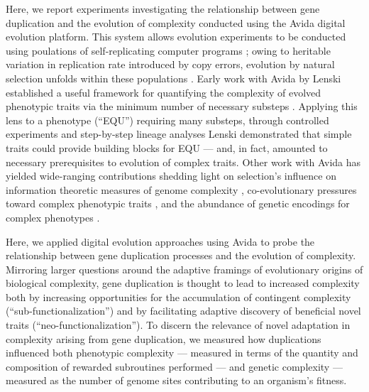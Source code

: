 Here, we report experiments investigating the relationship between gene duplication and the evolution of complexity conducted using the Avida digital evolution platform.
This system allows evolution experiments to be conducted using poulations of self-replicating computer programs \citep{Ofria:2009avida};
owing to heritable variation in replication rate introduced by copy errors, evolution by natural selection unfolds within these populations \citep{pennock2007models}.
Early work with Avida by Lenski established a useful framework for quantifying the complexity of evolved phenotypic traits via the minimum number of necessary substeps  \citet{lenski2003evolutionary}.
Applying this lens to a phenotype  (``EQU'') requiring many substeps, through controlled experiments and step-by-step lineage analyses Lenski demonstrated that simple traits could provide building blocks for EQU --- and, in fact, amounted to necessary prerequisites to evolution of complex traits.
Other work with Avida has yielded wide-ranging contributions shedding light on selection's influence on information theoretic measures of genome complexity \citep{Adami2000Evolution}, co-evolutionary pressures toward complex phenotypic traits \citep{Zaman2014Coevolution}, and the abundance of genetic encodings for complex phenotypes \citep{Fortuna2017GenotypePhenotype}.

Here, we applied digital evolution approaches using Avida to probe the relationship between gene duplication processes and the evolution of complexity.
Mirroring larger questions around the adaptive framings of evolutionary origins of biological complexity, gene duplication is thought to lead to increased complexity both by increasing opportunities for the accumulation of contingent complexity (``sub-functionalization'') and by facilitating adaptive discovery of beneficial novel traits (``neo-functionalization'').
To discern the relevance of novel adaptation in complexity arising from gene duplication, we measured how duplications influenced both phenotypic complexity --- measured in terms of the quantity and composition of rewarded subroutines performed --- and genetic complexity --- measured as the number of genome sites contributing to an organism's fitness.

